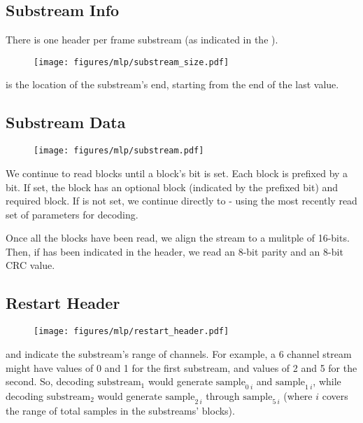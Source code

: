 \subsection{Substream Info}
There is one  header per frame substream
(as indicated in the ).
\begin{figure}[h]
\texttt{[image: figures/mlp/substream\_size.pdf]}
\end{figure}
\par
\noindent
{} is the location of the substream's end,
starting from the end of the last  value.

\clearpage

\subsection{Substream Data}

\begin{figure}[h]
\texttt{[image: figures/mlp/substream.pdf]}
\end{figure}
We continue to read blocks until a block's  bit is set.
Each block is prefixed by a  bit.
If set, the block has an optional  block
(indicated by the prefixed  bit)
and required  block.
If  is not set, we continue directly to
 - using the most recently read set of parameters for
decoding.

Once all the blocks have been read, we align the stream to a
mulitple of 16-bits.
Then, if  has been indicated in the
 header, we read an 8-bit parity
and an 8-bit CRC value.

\subsection{Restart Header}
\begin{figure}[h]
\texttt{[image: figures/mlp/restart\_header.pdf]}
\end{figure}
\par
\noindent
{} and  indicate the substream's
range of channels.
For example, a 6 channel stream might have values of 0 and 1
for the first substream, and values of 2 and 5 for the second.
So, decoding $\text{substream}_1$ would generate $\text{sample}_{0~i}$
and $\text{sample}_{1~i}$, while decoding $\text{substream}_2$ would
generate $\text{sample}_{2~i}$ through $\text{sample}_{5~i}$
(where $i$ covers the range of total samples in the substreams' blocks).

